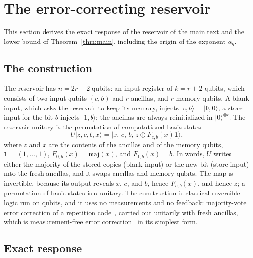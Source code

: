 \documentclass[aps,prl,twocolumn,superscriptaddress,floatfix]{revtex4-2}
\theoremstyle{plain}
\newcommand{\ket}[1]{|#1\rangle}
\begin{document}
\section{The error-correcting reservoir}
\label{sm:rep}

This section derives the exact response of the reservoir of the main text and the lower bound of Theorem~\ref{thm:main}, including the origin of the exponent $\alpha_q$.

\subsection{The construction}

The reservoir has $n=2r+2$ qubits: an input register of $k=r+2$ qubits, which consists of two input qubits $(c,b)$ and $r$ ancillas, and $r$ memory qubits. A blank input, which asks the reservoir to keep its memory, injects $\ket{c,b}=\ket{0,0}$; a store input for the bit $b$ injects $\ket{1,b}$; the ancillas are always reinitialized in $\ket0^{\otimes r}$. The reservoir unitary is the permutation of computational basis states
\begin{equation}
U\ket{z,c,b,x}=\ket{x,\,c,\,b,\,z\oplus F_{c,b}(x)\bm1},
\label{eq:S-repU}
\end{equation}
where $z$ and $x$ are the contents of the ancillas and of the memory qubits, $\bm1=(1,\dots,1)$, $F_{0,b}(x)=\mathrm{maj}(x)$, and $F_{1,b}(x)=b$. In words, $U$ writes either the majority of the stored copies (blank input) or the new bit (store input) into the fresh ancillas, and it swaps ancillas and memory qubits. The map is invertible, because its output reveals $x$, $c$, and $b$, hence $F_{c,b}(x)$, and hence $z$; a permutation of basis states is a unitary. The construction is classical reversible logic run on qubits, and it uses no measurements and no feedback: majority-vote error correction of a repetition code~\cite{vonNeumann1956}, carried out unitarily with fresh ancillas, which is measurement-free error correction~\cite{Heussen2024} in its simplest form.

\subsection{Exact response}
\end{document}
